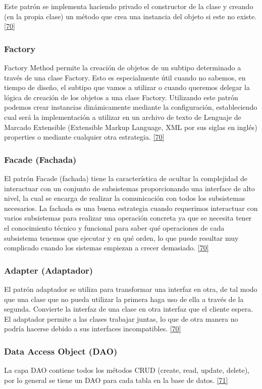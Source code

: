 Este patrón se implementa haciendo privado el constructor de la clase y creando (en la propia clase) un método que crea una instancia del objeto si este no existe. \hyperlink{b70}{[70]} 

\subsubsection{Factory}
Factory Method permite la creación de objetos de un subtipo determinado a través de una clase Factory. Esto es especialmente útil cuando no sabemos, en tiempo de diseño, el subtipo que vamos a utilizar o cuando queremos delegar la lógica de creación de los objetos a una clase Factory. Utilizando este patrón podemos crear instancias dinámicamente mediante la configuración, estableciendo cual será la implementación a utilizar en un archivo de texto de Lenguaje de Marcado Extensible (Extensible Markup Language, XML por sus siglas en inglés) properties o mediante cualquier otra estrategia. \hyperlink{b70}{[70]}

\subsubsection{Facade (Fachada)}
El patrón Facade (fachada) tiene la característica de ocultar la complejidad de interactuar con un conjunto de subsistemas proporcionando una interface de alto nivel, la cual se encarga de realizar la comunicación con todos los subsistemas necesarios. La fachada es una buena estrategia cuando requerimos interactuar con varios subsistemas para realizar una operación concreta ya que se necesita tener el conocimiento técnico y funcional para saber qué operaciones de cada subsistema tenemos que ejecutar y en qué orden, lo que puede resultar muy complicado cuando los sistemas empiezan a crecer demasiado. \hyperlink{b70}{[70]}

\subsubsection{Adapter (Adaptador)}
El patrón adaptador se utiliza para transformar una interfaz en otra, de tal modo que una clase que no pueda utilizar la primera haga uso de ella a través de la segunda. Convierte la interfaz de una clase en otra interfaz que el cliente espera. El adaptador permite a las clases trabajar juntas, lo que de otra manera no podría hacerse debido a sus interfaces incompatibles. \hyperlink{b70}{[70]}

\subsubsection{Data Access Object (DAO)}
La capa DAO contiene todos los métodos CRUD (create, read, update, delete), por lo general se tiene un DAO para cada tabla en la base de datos. \hyperlink{b71}{[71]}


